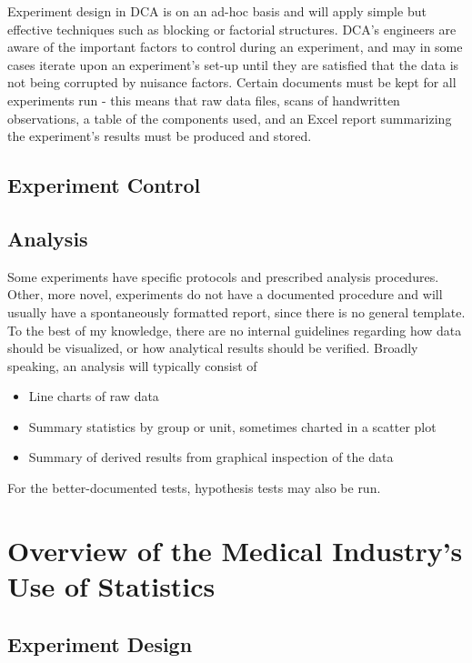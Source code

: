 \documentclass[11pt,a4paper,article]{memoir} %
\begin{document}
Experiment design in DCA is on an ad-hoc basis and will apply simple but effective techniques such as blocking or factorial structures. DCA's engineers are aware of the important factors to control during an experiment, and may in some cases iterate upon an experiment's set-up until they are satisfied that the data is not being corrupted by nuisance factors.
Certain documents must be kept for all experiments run - this means that raw data files, scans of handwritten observations, a table of the components used, and an Excel report summarizing the experiment's results must be produced and stored.

\section{Experiment Control}

\section{Analysis}

 Some experiments have specific protocols and prescribed analysis procedures. Other, more novel, experiments do not have a documented procedure and will usually have a spontaneously formatted report, since there is no general template.  To the best of my knowledge, there are no internal guidelines regarding how data should be visualized, or how analytical results should be verified. Broadly speaking, an analysis will typically consist of
 \begin{itemize}
 	\item Line charts of raw data
 	\item Summary statistics by group or unit, sometimes charted in a scatter plot
 	\item Summary of derived results from graphical inspection of the data
 \end{itemize}
 For the better-documented tests, hypothesis tests may also be run.
\par



\newpage
\chapter{Overview of the Medical Industry's Use of Statistics}\label{industry_context} %

\section{Experiment Design}
\end{document}
